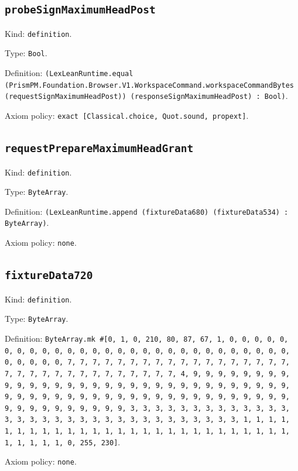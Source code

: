 \documentclass[11pt]{article}
\begin{document}
\subsection*{\texttt{probeSignMaximumHeadPost}}
\noindent Kind: \texttt{definition}.\par
\noindent Type: \texttt{Bool}.\par
\noindent Definition: \texttt{(LexLeanRuntime.equal (PrismPM.Foundation.Browser.V1.WorkspaceCommand.workspaceCommandBytes (requestSignMaximumHeadPost)) (responseSignMaximumHeadPost) : Bool)}.\par
\noindent Axiom policy: \texttt{exact [Classical.choice, Quot.sound, propext]}.\par
\subsection*{\texttt{requestPrepareMaximumHeadGrant}}
\noindent Kind: \texttt{definition}.\par
\noindent Type: \texttt{ByteArray}.\par
\noindent Definition: \texttt{(LexLeanRuntime.append (fixtureData680) (fixtureData534) : ByteArray)}.\par
\noindent Axiom policy: \texttt{none}.\par
\subsection*{\texttt{fixtureData720}}
\noindent Kind: \texttt{definition}.\par
\noindent Type: \texttt{ByteArray}.\par
\noindent Definition: \texttt{ByteArray.mk \#[0, 1, 0, 210, 80, 87, 67, 1, 0, 0, 0, 0, 0, 0, 0, 0, 0, 0, 0, 0, 0, 0, 0, 0, 0, 0, 0, 0, 0, 0, 0, 0, 0, 0, 0, 0, 0, 0, 0, 0, 0, 7, 7, 7, 7, 7, 7, 7, 7, 7, 7, 7, 7, 7, 7, 7, 7, 7, 7, 7, 7, 7, 7, 7, 7, 7, 7, 7, 7, 7, 7, 7, 7, 4, 9, 9, 9, 9, 9, 9, 9, 9, 9, 9, 9, 9, 9, 9, 9, 9, 9, 9, 9, 9, 9, 9, 9, 9, 9, 9, 9, 9, 9, 9, 9, 9, 9, 9, 9, 9, 9, 9, 9, 9, 9, 9, 9, 9, 9, 9, 9, 9, 9, 9, 9, 9, 9, 9, 9, 9, 9, 9, 9, 9, 9, 9, 9, 9, 3, 3, 3, 3, 3, 3, 3, 3, 3, 3, 3, 3, 3, 3, 3, 3, 3, 3, 3, 3, 3, 3, 3, 3, 3, 3, 3, 3, 3, 3, 3, 3, 1, 1, 1, 1, 1, 1, 1, 1, 1, 1, 1, 1, 1, 1, 1, 1, 1, 1, 1, 1, 1, 1, 1, 1, 1, 1, 1, 1, 1, 1, 1, 1, 0, 255, 230]}.\par
\noindent Axiom policy: \texttt{none}.\par
\end{document}
